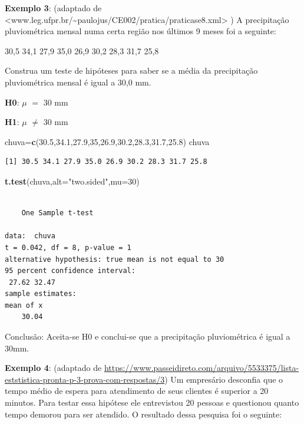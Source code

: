 \documentclass[12pt,brazil,oneside]{book}
\newenvironment{Shaded}{\begin{snugshade}}{\end{snugshade}}
\newcommand{\DataTypeTok}[1]{\textcolor[rgb]{0.13,0.29,0.53}{#1}}
\newcommand{\DecValTok}[1]{\textcolor[rgb]{0.00,0.00,0.81}{#1}}
\newcommand{\FloatTok}[1]{\textcolor[rgb]{0.00,0.00,0.81}{#1}}
\newcommand{\KeywordTok}[1]{\textcolor[rgb]{0.13,0.29,0.53}{\textbf{#1}}}
\newcommand{\NormalTok}[1]{#1}
\newcommand{\StringTok}[1]{\textcolor[rgb]{0.31,0.60,0.02}{#1}}
\begin{document}
\textbf{Exemplo 3}: (adaptado de
\textless{}www.leg.ufpr.br/\textasciitilde{}paulojus/CE002/pratica/praticase8.xml\textgreater{}
) A precipitação pluviométrica mensal numa certa região nos últimos 9
meses foi a seguinte:

30,5 34,1 27,9 35,0 26,9 30,2 28,3 31,7 25,8

Construa um teste de hipóteses para saber se a média da precipitação
pluviométrica mensal é igual a 30,0 mm.

\textbf{H0}: \(\mu\) \(=\) 30 mm

\textbf{H1}: \(\mu\) \(\neq\) 30 mm

\begin{Shaded}
\begin{Highlighting}[]
\NormalTok{chuva=}\KeywordTok{c}\NormalTok{(}\FloatTok{30.5}\NormalTok{,}\FloatTok{34.1}\NormalTok{,}\FloatTok{27.9}\NormalTok{,}\DecValTok{35}\NormalTok{,}\FloatTok{26.9}\NormalTok{,}\FloatTok{30.2}\NormalTok{,}\FloatTok{28.3}\NormalTok{,}\FloatTok{31.7}\NormalTok{,}\FloatTok{25.8}\NormalTok{)}
\NormalTok{chuva}
\end{Highlighting}
\end{Shaded}

\begin{verbatim}
[1] 30.5 34.1 27.9 35.0 26.9 30.2 28.3 31.7 25.8
\end{verbatim}

\begin{Shaded}
\begin{Highlighting}[]
\KeywordTok{t.test}\NormalTok{(chuva,}\DataTypeTok{alt=}\StringTok{"two.sided"}\NormalTok{,}\DataTypeTok{mu=}\DecValTok{30}\NormalTok{)}
\end{Highlighting}
\end{Shaded}

\begin{verbatim}

    One Sample t-test

data:  chuva
t = 0.042, df = 8, p-value = 1
alternative hypothesis: true mean is not equal to 30
95 percent confidence interval:
 27.62 32.47
sample estimates:
mean of x 
    30.04 
\end{verbatim}

Conclusão: Aceita-se H0 e conclui-se que a precipitação pluviométrica é
igual a 30mm.

\textbf{Exemplo 4}: (adaptado de
\url{https://www.passeidireto.com/arquivo/5533375/lista-eststistica-pronta-p-3-prova-com-respostas/3})
Um empresário desconfia que o tempo médio de espera para atendimento de
seus clientes é superior a 20 minutos. Para testar essa hipótese ele
entrevistou 20 pessoas e questionou quanto tempo demorou para ser
atendido. O resultado dessa pesquisa foi o seguinte:
\end{document}
